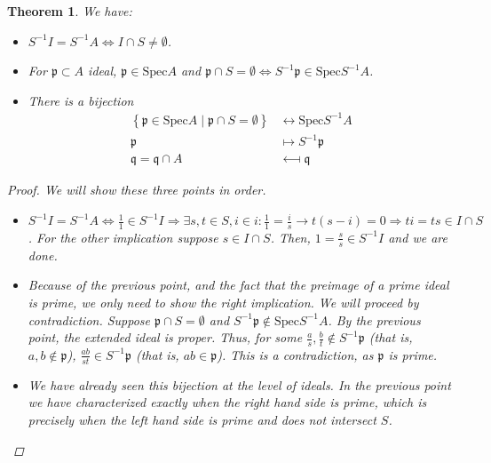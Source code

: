 \documentclass[11pt]{article}
\newtheorem{theorem}{Theorem}[section]
\theoremstyle{definition}
\begin{document}
        \begin{theorem}
            We have:
            \begin{itemize}
                \item $S^{-1}I = S^{-1}A \Leftrightarrow I \cap S \neq \emptyset$.
                \item For $\mathfrak{p} \subset A$ ideal, $\mathfrak{p}\in\text{Spec} A$ and
                $\mathfrak{p} \cap S = \emptyset \Leftrightarrow S^{-1}\mathfrak{p} \in\text{Spec} S^{-1}A$.
                \item There is a bijection
                \[
                    \begin{aligned}
                        \left\{ \mathfrak{p} \in\text{Spec} A \mid \mathfrak{p} \cap S = \emptyset \right\} &\longleftrightarrow\text{Spec} S^{-1}A \\
                        \mathfrak{p} &\longmapsto S^{-1}\mathfrak{p} \\
                        \mathfrak{q} = \mathfrak{q} \cap A &\longmapsfrom \mathfrak{q}
                    \end{aligned}
                \]
            \end{itemize}

            \begin{proof}

                We will show these three points in order.

                \begin{itemize}
                    \item $S^{-1}I = S^{-1}A \Leftrightarrow \frac{1}{1} \in S^{-1}I \Rightarrow
                    \exists s, t \in S, i \in i \colon \frac{1}{1} = \frac{i}{s} \rightarrow t (s - i) = 0
                    \Rightarrow ti = ts \in I \cap S$.
                    For the other implication suppose $s \in I \cap S$.
                    Then, $1 = \frac{s}{s} \in S^{-1}I$ and we are done.
                    \item Because of the previous point,
                    and the fact that the preimage of a prime ideal is prime,
                    we only need to show the right implication.
                    We will proceed by contradiction.
                    Suppose
                    $\mathfrak{p} \cap S = \emptyset$ and $S^{-1}\mathfrak{p} \notin\text{Spec} S^{-1}A$.
                    By the previous point, the extended ideal is proper.
                    Thus, for some $\frac{a}{s}, \frac{b}{t} \notin S^{-1}\mathfrak{p}$
                    (that is, $a, b \notin \mathfrak{p}$),
                    $\frac{ab}{st} \in S^{-1}\mathfrak{p}$ (that is, $ab \in \mathfrak{p}$).
                    This is a contradiction, as $\mathfrak{p}$ is prime.
                    \item We have already seen this bijection at the level of ideals.
                    In the previous point we have characterized exactly when the right hand side is prime,
                    which is precisely when the left hand side is prime and does not intersect $S$.



\end{itemize}
\end{proof}
\end{theorem}
\end{document}
